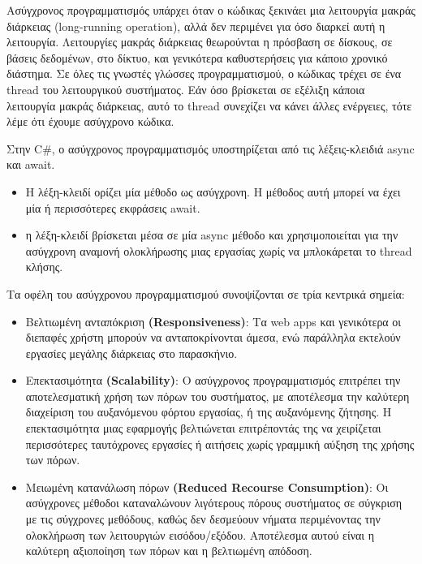 Ασύγχρονος προγραμματισμός υπάρχει όταν ο κώδικας ξεκινάει μια λειτουργία μακράς διάρκειας (long-running operation), αλλά δεν περιμένει για όσο διαρκεί αυτή η λειτουργία. Λειτουργίες μακράς διάρκειας θεωρούνται η πρόσβαση σε δίσκους, σε βάσεις δεδομένων, στο δίκτυο, και γενικότερα καθυστερήσεις για κάποιο χρονικό διάστημα. Σε όλες τις γνωστές γλώσσες προγραμματισμού, ο κώδικας τρέχει σε ένα thread του λειτουργικού συστήματος. Εάν όσο βρίσκεται σε εξέλιξη κάποια λειτουργία μακράς διάρκειας, αυτό το thread συνεχίζει να κάνει άλλες ενέργειες, τότε λέμε ότι έχουμε ασύγχρονο κώδικα. 

Στην C\#, ο ασύγχρονος προγραμματισμός υποστηρίζεται από τις λέξεις-κλειδιά async και await.
\begin{itemize}
    \item Η λέξη-κλειδί  ορίζει μία μέθοδο ως ασύγχρονη. Η μέθοδος αυτή μπορεί να έχει μία ή περισσότερες εκφράσεις await.
    \item η λέξη-κλειδί  βρίσκεται μέσα σε μία async μέθοδο και χρησιμοποιείται για την ασύγχρονη αναμονή ολοκλήρωσης μιας εργασίας χωρίς να μπλοκάρεται το thread κλήσης. 
\end{itemize}

Τα οφέλη του ασύγχρονου προγραμματισμού συνοψίζονται σε τρία κεντρικά σημεία: 
\begin{itemize}
    \item Βελτιωμένη ανταπόκριση \textbf{(Responsiveness)}: Τα web apps και γενικότερα οι διεπαφές χρήστη μπορούν να ανταποκρίνονται άμεσα, ενώ παράλληλα εκτελούν εργασίες μεγάλης διάρκειας στο παρασκήνιο. 
    \item Επεκτασιμότητα \textbf{(Scalability)}: Ο ασύγχρονος προγραμματισμός επιτρέπει την αποτελεσματική χρήση των πόρων του συστήματος, με αποτέλεσμα την καλύτερη διαχείριση του αυξανόμενου φόρτου εργασίας, ή της αυξανόμενης ζήτησης. Η επεκτασιμότητα μιας εφαρμογής βελτιώνεται επιτρέποντάς της να χειρίζεται περισσότερες ταυτόχρονες εργασίες ή αιτήσεις χωρίς γραμμική αύξηση της χρήσης των πόρων.
    \item Μειωμένη κατανάλωση πόρων \textbf{(Reduced Recourse Consumption)}: Οι ασύγχρονες μέθοδοι καταναλώνουν λιγότερους πόρους συστήματος σε σύγκριση με τις σύγχρονες μεθόδους, καθώς δεν δεσμεύουν νήματα περιμένοντας την ολοκλήρωση των λειτουργιών εισόδου/εξόδου. Αποτέλεσμα αυτού είναι η καλύτερη αξιοποίηση των πόρων και η βελτιωμένη απόδοση.
\end{itemize}

